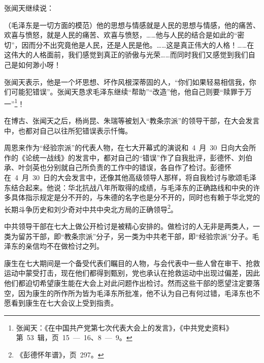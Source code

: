 张闻天继续说：

\begin{quoting}
（毛泽东是一切方面的模范）他的思想与情感就是人民的思想与情感，他的痛苦、欢喜与愤怒，就是人民的痛苦、欢喜与愤怒，……他与人民的结合是如此的“密切”，因而分不出究竟他是人民，还是人民是他。……这是真正伟大的人格！……在这伟大的人格面前，我们感觉到真正的骄傲与光荣……而同时我们又感觉到我们自己是如何渺小呀！
\end{quoting}

张闻天表示，他是一个坏思想、坏作风根深蒂固的人，“你们如果轻易相信我，你们可能犯错误”。张闻天恳求毛泽东继续“帮助”“改造”他，他自己则要“赎罪于万一”\footnote{张闻天：《在中国共产党第七次代表大会上的发言》，《中共党史资料》第~53~辑，页~15~—~16、8~—~9。}！

在博古、张闻天之后，杨尚昆、朱瑞等被划入“教条宗派”的领导干部，在大会发言中，也都对自己以往所犯错误表示忏悔。

周恩来作为“经验宗派”的代表人物，在七大开幕式的演说和~4~月~30~日向大会所作的《论统一战线》的发言中，都对自己的“错误”作了自我批评，彭德怀、刘伯承、叶剑英也分别就自己所负责的工作中的错误，各自作了检讨。彭德怀在~4~月~30~日的大会发言中，还像其他高级领导人那样，将自我检讨与歌颂毛泽东结合起来。他说：华北抗战八年所取得的成绩，与毛泽东的正确路线和中央的许多具体指示规定是分不开的，与朱德的名字也是分不开的，同时也有赖于华北党的长期斗争历史和刘少奇对中共中央北方局的正确领导\footnote{《彭德怀年谱》，页~297。}。

中共领导干部在七大上做公开检讨是被精心安排的。做检讨的人无非是两类人，一类为留苏干部，即“教条宗派”分子，另一类为中共老干部，即“经验宗派”分子。毛泽东的亲信均不在做检讨之列。

康生在七大期间是一个备受代表们瞩目的人物，与会代表中一些人曾在审干、抢救运动中蒙受打击，现在他们都得到甄别，党也承认在抢救运动中出现过偏差，因此他们都迫切希望康生能在大会上对此问题作出检讨。然而这些干部的愿望注定要落空，因为康生的所作所为皆为毛泽东所批准，他不认为自己有何过错，毛泽东也不愿看到康生在七大会议上受到指责。

